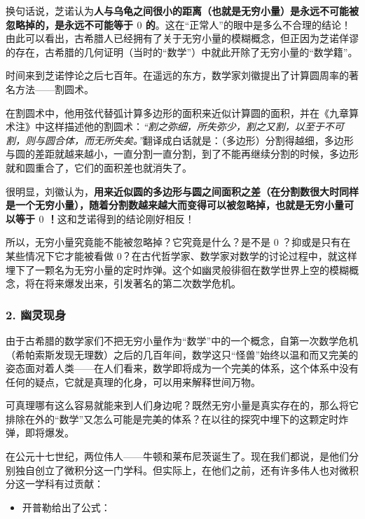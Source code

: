 \documentclass[
]{article}
\begin{document}
换句话说，芝诺认为\textbf{人与乌龟之间很小的距离（也就是无穷小量）是永远不可能被忽略掉的，是永远不可能等于
\(0\)
的}。这在``正常人''的眼中是多么不合理的结论！由此可以看出，古希腊人已经拥有了关于无穷小量的模糊概念，但正因为芝诺佯谬的存在，古希腊的几何证明（当时的``数学''）中就此开除了无穷小量的``数学籍''。

时间来到芝诺悖论之后七百年。在遥远的东方，数学家刘徽提出了计算圆周率的著名方法------割圆术。

在割圆术中，他用弦代替弧计算多边形的面积来近似计算圆的面积，并在《九章算术注》中这样描述他的割圆术：\emph{``割之弥细，所失弥少，割之又割，以至于不可割，则与圆合体，而无所失矣。''}翻译成白话就是：（多边形）分割得越细，多边形与圆的差距就越来越小，一直分割一直分割，到了不能再继续分割的时候，多边形就和圆重合了，它们的面积差也就消失了。

很明显，刘徽认为，\textbf{用来近似圆的多边形与圆之间面积之差（在分割数很大时同样是一个无穷小量），随着分割数越来越大而变得可以被忽略掉，也就是无穷小量可以等于
\(0\) ！}这和芝诺得到的结论刚好相反！

所以，无穷小量究竟能不能被忽略掉？它究竟是什么？是不是 \(0\)
？抑或是只有在某些情况下它才能被看做
\(0\)？在古代哲学家、数学家对数学的讨论过程中，就这样埋下了一颗名为无穷小量的定时炸弹。这个如幽灵般徘徊在数学世界上空的模糊概念，将在将来爆发出来，引发著名的第二次数学危机。

\hypertarget{header-n17}{%
\subsubsection{2. 幽灵现身}\label{header-n17}}

由于古希腊的数学家们不把无穷小量作为``数学''中的一个概念，自第一次数学危机（希帕索斯发现无理数）之后的几百年间，数学这只``怪兽''始终以温和而又完美的姿态面对着人类------在人们看来，数学即将成为一个完美的体系，这个体系中没有任何的疑点，它就是真理的化身，可以用来解释世间万物。

可真理哪有这么容易就能来到人们身边呢？既然无穷小量是真实存在的，那么将它排除在外的``数学''又怎么可能是完美的体系？在以往的探究中埋下的这颗定时炸弹，即将爆发。

在公元十七世纪，两位伟人------牛顿和莱布尼茨诞生了。现在我们都说，是他们分别独自创立了微积分这一门学科。但实际上，在他们之前，还有许多伟人也对微积分这一学科有过贡献：

\begin{itemize}
\item
  开普勒给出了公式：
\end{itemize}
\end{document}
